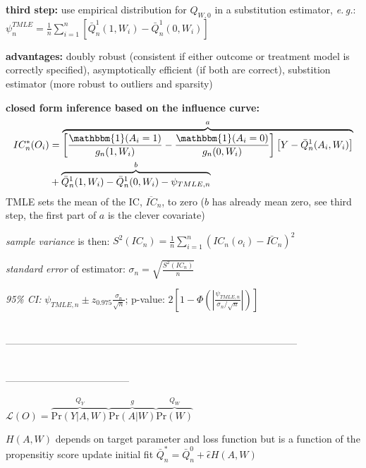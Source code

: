 \documentclass[8pt,oneside]{extarticle}
\begin{document}
\begin{multicols}{2}
\noindent \textbf{third step:} use empirical distribution for $Q_{W,0}$ in a substitution estimator, \textit{e.\,g.}: $\psi_n^{TMLE} = \frac{1}{n}\sum_{i=1}^n \left[\bar{Q}^1_n(1,W_i) -  \bar{Q}^1_n(0,W_i)\right] $ 



\noindent \textbf{advantages:} doubly robust (consistent if either outcome or treatment model is correctly specified), asymptotically efficient (if both are correct), substition estimator (more robust to outliers and sparsity)

\noindent \textbf{closed form inference based on the influence curve:}
\begin{align*}IC_n^*(O_i) &= \overbrace{\left[\frac{\mathbbm{1}(A_i=1)}{g_n(1,W_i)} - \frac{\mathbbm{1}(A_i=0)}{g_n(0,W_i)}\right] \left[Y-\bar{Q}^1_n(A_i,W_i)\right]}^{a} \\ 
&+ \overbrace{\bar{Q}^1_n(1,W_i) - \bar{Q}^1_n(0,W_i) -\psi_{TMLE,n}}^{b} 
\end{align*}
TMLE sets the mean of the IC, $\overline{IC}_n$, to zero ($b$ has already mean zero, see third step, the first part of $a$ is the clever covariate)

\noindent \textit{sample variance} is then: $S^2(IC_n) = \frac{1}{n}\sum_{i=1}^n\left(IC_n(o_i) - \bar{IC}_n\right)^2$

\noindent \textit{standard error} of estimator: $\sigma_n = \sqrt{\frac{S^2(IC_n)}{n}}$

\noindent \textit{95\% CI:} $\psi_{TMLE,n} \pm z_{0.975}\frac{\sigma_n}{\sqrt{n}}$; p-value: $2\left[1-\Phi\left(\left|\frac{\psi_{TMLE,n}}{\sigma_n/\sqrt{n}}\right|\right)\right]$







\ \\
\noindent-----------------------------------------------------------------------------------------






\ \\
\noindent --------------------------------------

\vspace{30 em}

$\mathcal{L}(O) = \overbrace{\mathrm{Pr}(Y|A, W)}^{Q_Y}\overbrace{\mathrm{Pr}(A|W)}^{g}\overbrace{\mathrm{Pr}(W)}^{Q_W}$



$H(A,W)$ depends on target parameter and loss function but is a function of the propensitiy score
update initial fit $\bar{Q}^*_n = \bar{Q}^0_n + \hat{\epsilon}H(A,W)$



\end{multicols}
\end{document}
